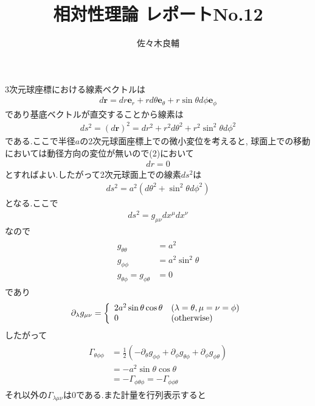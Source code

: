 \documentclass[uplatex,a4j,11pt,dvipdfmx]{jsarticle}
\begin{document}
\title{相対性理論 レポートNo.12}
\author{佐々木良輔}
\date{}
\maketitle
3次元球座標における線素ベクトルは
\begin{align}
  d{\bm r}=dr{\bm e}_r+rd\theta{\bm e}_\theta+r\sin\theta d\phi{\bm e}_\phi
\end{align}
であり基底ベクトルが直交することから線素は
\begin{align}
  ds^2=(d{\bm r})^2=dr^2+r^2d\theta^2+r^2\sin^2\theta d\phi^2
\end{align}
である.ここで半径$a$の2次元球面座標上での微小変位を考えると,
球面上での移動においては動径方向の変位が無いので(2)において
\begin{align}
  dr=0
\end{align}
とすればよい.したがって2次元球面上での線素$ds^2$は
\begin{align}
  ds^2=a^2(d\theta^2+\sin^2\theta d\phi^2)
\end{align}
となる.ここで
\begin{align}
  ds^2=g_{\mu\nu}dx^\mu dx^\nu
\end{align}
なので
\begin{align}
  \begin{split}
    g_{\theta\theta}&=a^2\\
    g_{\phi\phi}&=a^2\sin^2\theta\\
    g_{\theta\phi}=g_{\phi\theta}&=0
  \end{split}
\end{align}
であり
\begin{align}
  \partial_\lambda g_{\mu\nu}=\left\{
    \begin{array}{ll}
      2a^2\sin\theta\cos\theta&(\lambda=\theta,\mu=\nu=\phi)\\
      0&({\rm otherwise})
    \end{array}
    \right.
\end{align}
したがって
\begin{align}
  \begin{split}
    \Gamma_{\theta\phi\phi}&=\frac{1}{2}(-\partial_\theta g_{\phi\phi}+\partial_\phi g_{\theta\phi}+\partial_\phi g_{\phi\theta})\\
    &=-a^2\sin\theta\cos\theta\\
    &=-\Gamma_{\phi\theta\phi}=-\Gamma_{\phi\phi\theta}
  \end{split}
\end{align}
それ以外の$\Gamma_{\lambda\mu\nu}$は$0$である.また計量を行列表示すると
\end{document}
